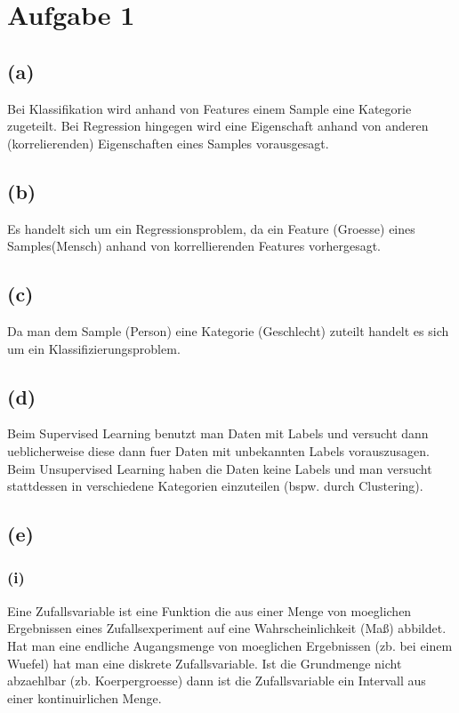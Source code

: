 \documentclass[a4paper]{scrartcl}
\begin{document}
	
	
\section*{Aufgabe 1}
\subsection*{(a)}
Bei Klassifikation wird anhand von Features einem Sample eine Kategorie zugeteilt. Bei Regression hingegen wird eine Eigenschaft anhand von anderen (korrelierenden) Eigenschaften eines Samples vorausgesagt.

\subsection*{(b)}
Es handelt sich um ein Regressionsproblem, da ein Feature (Groesse) eines Samples(Mensch) anhand von korrellierenden Features vorhergesagt.

\subsection*{(c)}
Da man dem Sample (Person) eine Kategorie (Geschlecht) zuteilt handelt es sich um ein Klassifizierungsproblem.


\subsection*{(d)}
Beim Supervised Learning benutzt man Daten mit Labels und versucht dann ueblicherweise diese dann fuer Daten mit unbekannten Labels vorauszusagen.\\
Beim Unsupervised Learning haben die Daten keine Labels und man versucht stattdessen in verschiedene Kategorien einzuteilen (bspw. durch Clustering).

\subsection*{(e)}
\subsubsection*{(i)}
Eine Zufallsvariable ist eine Funktion die aus einer Menge von moeglichen Ergebnissen eines Zufallsexperiment auf eine Wahrscheinlichkeit (Maß) abbildet. Hat man eine endliche Augangsmenge von moeglichen Ergebnissen (zb. bei einem Wuefel) hat man eine diskrete Zufallsvariable. Ist die Grundmenge nicht abzaehlbar (zb. Koerpergroesse) dann ist die Zufallsvariable ein Intervall aus einer kontinuirlichen Menge.
\end{document}
